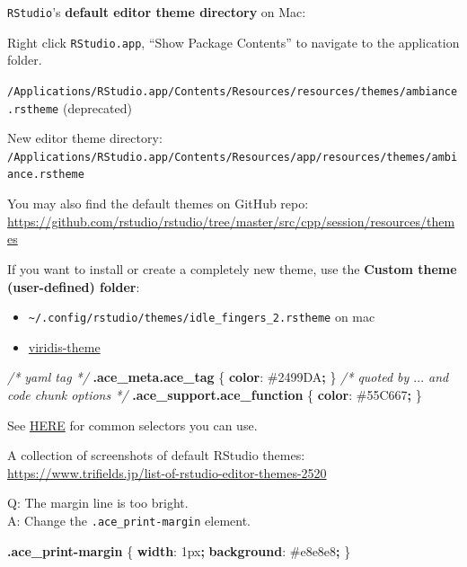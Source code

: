 \documentclass[
]{book}
\newenvironment{Shaded}{\begin{snugshade}}{\end{snugshade}}
\newcommand{\CharTok}[1]{\textcolor[rgb]{0.31,0.60,0.02}{#1}}
\newcommand{\CommentTok}[1]{\textcolor[rgb]{0.56,0.35,0.01}{\textit{#1}}}
\newcommand{\ConstantTok}[1]{\textcolor[rgb]{0.56,0.35,0.01}{#1}}
\newcommand{\DataTypeTok}[1]{\textcolor[rgb]{0.13,0.29,0.53}{#1}}
\newcommand{\DecValTok}[1]{\textcolor[rgb]{0.00,0.00,0.81}{#1}}
\newcommand{\FunctionTok}[1]{\textcolor[rgb]{0.13,0.29,0.53}{\textbf{#1}}}
\newcommand{\KeywordTok}[1]{\textcolor[rgb]{0.13,0.29,0.53}{\textbf{#1}}}
\newcommand{\NormalTok}[1]{#1}
\newcommand{\OperatorTok}[1]{\textcolor[rgb]{0.81,0.36,0.00}{\textbf{#1}}}
\providecommand{\tightlist}{%
  \setlength{\itemsep}{0pt}\setlength{\parskip}{0pt}}
\theoremstyle{definition}
\theoremstyle{definition}
\theoremstyle{definition}
\theoremstyle{definition}
\theoremstyle{remark}
\begin{document}
\texttt{RStudio}'s \textbf{default editor theme directory} on Mac:

Right click \texttt{RStudio.app}, ``Show Package Contents'' to navigate to the application folder.

\texttt{/Applications/RStudio.app/Contents/Resources/resources/themes/ambiance.rstheme} (deprecated)

New editor theme directory: \texttt{/Applications/RStudio.app/Contents/Resources/app/resources/themes/ambiance.rstheme}

You may also find the default themes on GitHub repo: \url{https://github.com/rstudio/rstudio/tree/master/src/cpp/session/resources/themes}

If you want to install or create a completely new theme, use the \textbf{Custom theme (user-defined) folder}:

\begin{itemize}
\tightlist
\item
  \texttt{\textasciitilde{}/.config/rstudio/themes/idle\_fingers\_2.rstheme} on mac
\item
  \href{https://github.com/z3tt/viridis-theme/blob/main/viridis.rstheme}{viridis-theme}
\end{itemize}

\begin{Shaded}
\begin{Highlighting}[]
\CommentTok{/* yaml tag */}
\FunctionTok{.ace\_meta.ace\_tag}\NormalTok{ \{}
  \KeywordTok{color}\CharTok{:} \ConstantTok{\#2499DA}\OperatorTok{;}
\NormalTok{\}}
\CommentTok{/* quoted by $...$ and code chunk options */}
\FunctionTok{.ace\_support.ace\_function}\NormalTok{ \{}
  \KeywordTok{color}\CharTok{:} \ConstantTok{\#55C667}\OperatorTok{;}
\NormalTok{\}}
\end{Highlighting}
\end{Shaded}

See \href{https://docs.posit.co/ide/user/ide/guide/ui/appearance.html\#creating-an-rstheme}{HERE} for common selectors you can use.

A collection of screenshots of default RStudio themes: \url{https://www.trifields.jp/list-of-rstudio-editor-themes-2520}

Q: The margin line is too bright.\\
A: Change the \texttt{.ace\_print-margin} element.

\begin{Shaded}
\begin{Highlighting}[]
\FunctionTok{.ace\_print{-}margin}\NormalTok{ \{}
  \KeywordTok{width}\CharTok{:} \DecValTok{1}\DataTypeTok{px}\OperatorTok{;}
  \KeywordTok{background}\CharTok{:} \ConstantTok{\#e8e8e8}\OperatorTok{;}
\NormalTok{\}}
\end{Highlighting}
\end{Shaded}
\end{document}
